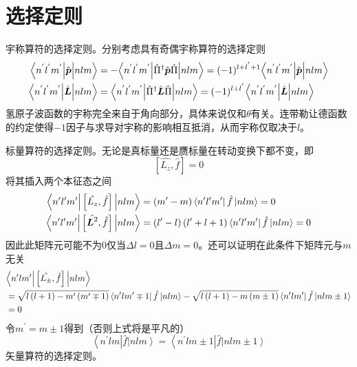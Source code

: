 \documentclass[12pt, a4paper, oneside]{ctexart}
\begin{document}
	\section{选择定则}
	宇称算符的选择定则。分别考虑具有奇偶宇称算符的选择定则
	\begin{align}
		\Big{<}n^{'}l^{'}m^{'}\Big{|}\hat{\boldsymbol{p}}\Big{|}nlm\Big{>}&=-\Big{<}n^{'}l^{'}m^{'}\Big{|}\hat{\Pi}^{\dagger}\hat{\boldsymbol{p}}\hat{\Pi}\Big{|}nlm\Big{>}=(-1)^{l+l^{'}+1}\Big{<}n^{'}l^{'}m^{'}\Big{|}\hat{\boldsymbol{p}}\Big{|}nlm\Big{>}\\
		\Big{<}n^{'}l^{'}m^{'}\Big{|}\hat{\boldsymbol{L}}\Big{|}nlm\Big{>}&=\Big{<}n^{'}l^{'}m^{'}\Big{|}\hat{\Pi}^{\dagger}\hat{\boldsymbol{L}}\hat{\Pi}\Big{|}nlm\Big{>}=(-1)^{l+l^{'}}\Big{<}n^{'}l^{'}m^{'}\Big{|}\hat{\boldsymbol{L}}\Big{|}nlm\Big{>}
	\end{align}
	\quad\quad 氢原子波函数的宇称完全来自于角向部分，具体来说仅和$\theta$有关。连带勒让德函数的约定使得$-1$因子与求导对宇称的影响相互抵消，从而宇称仅取决于$l$。\par 
	标量算符的选择定则。无论是真标量还是赝标量在转动变换下都不变，即
	\begin{equation}
		\left[\hat{L_{z}},\hat{f}\right]=0
	\end{equation}
	\quad\quad 将其插入两个本征态之间
	\begin{align}
		\Big{<}n^{\prime}l^{\prime}m^{\prime}\Big{|}\left[\hat{L_{z}},\hat{f}\right]\Big{|}nlm\Big{>}&=\left(m^{\prime}-m\right)\left<n^{\prime}l^{\prime}m^{\prime}\right|\hat{f}\left|nlm\right>=0\\
		\Big{<}n^{\prime}l^{\prime}m^{\prime}\Big{|}\left[\hat{\boldsymbol{L}^{2}},\hat{f}\right]\Big{|}nlm\Big{>}&=\left(l^{\prime}-l\right)\left(l^{\prime}+l+1\right)\left<n^{\prime}l^{\prime}m^{\prime}\right|\hat{f}\left|nlm\right>=0
	\end{align}
	\quad\quad 因此此矩阵元可能不为$0$仅当$\Delta l=0$且$\Delta m=0$。还可以证明在此条件下矩阵元与$m$无关
	\begin{align}
		&\Big{<}n^{\prime}lm^{\prime}\Big{|}\left[\hat{L_{\pm}},\hat{f}\right]\Big{|}nlm\Big{>}\\&=\sqrt{l\left(l+1\right)-m^{\prime}\left(m^{\prime}\mp1\right)}\left<n^{\prime}lm^{\prime}\mp1\right|\hat{f}\left|nlm\right>-\sqrt{l\left(l+1\right)-m\left(m\pm1\right)}\left<n^{\prime}lm^{\prime}\right|\hat{f}\left|nlm\pm1\right>\\&=0
	\end{align}
	\quad\quad 令$m^{\prime}=m\pm1$得到（否则上式将是平凡的）
	\begin{equation}
		\left<n^{\prime}lm\right|\hat{f}\left|nlm\right>=\left<n^{\prime}lm\pm1\right|\hat{f}\left|nlm\pm1\right>
	\end{equation}
	\quad\quad 矢量算符的选择定则。
\end{document}
